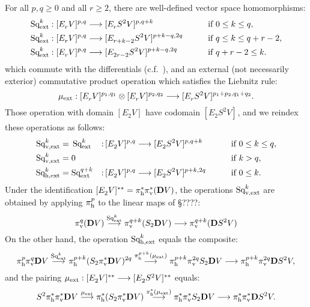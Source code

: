 \documentclass[11pt]{amsart}
\theoremstyle{plain}
\theoremstyle{definition}
\renewcommand{\to}{\longrightarrow}
\theoremstyle{plain}
\newcommand{\ExtCohOp}{\textup{Sq}_\textup{ext}}
\newcommand{\vExtCohOp}{\textup{Sq}_\textup{v,ext}}
\newcommand{\hExtCohOp}{\textup{Sq}_\textup{h,ext}}
\newcommand{\ExtCohProd}{\mu_\textup{ext}}
\newcommand{\E}[5]{[E^{#1}_{#2}#3]^{#4}_{#5}}
\newcommand{\dver}{_\textup{v}}
\newcommand{\dhor}{_\textup{h}}
\newcommand{\dual}{\mathbf{D}}
\begin{document}
\begin{Operations in composite functor spectral sequences}
For all $p,q\geq0$ and all $r\geq2$, there are well-defined vector space homomorphisms:
\begin{alignat*}{2}
\ExtCohOp^k:\E{}{r}{V}{p,q}{}&\to \E{}{r}{S^2V}{p,q+k}{}&\qquad&\text{if }0\leq k \leq q,\\
\ExtCohOp^k:\E{}{r}{V}{p,q}{}&\to \E{}{r+k-2}{S^2V}{p+k-q,2q}{}&\qquad&\text{if }q\leq k\leq q+r-2,\\
\ExtCohOp^k:\E{}{r}{V}{p,q}{}&\to \E{}{2r-2}{S^2V}{p+k-q,2q}{}&\qquad&\text{if }q+r-2\leq k.
\end{alignat*}
which commute with the differentials (c.f.\ \cite[Theorem 2.17]{MR2245560}), and an external (not necessarily exterior) commutative product operation which satisfies the Liebnitz rule:
\[\ExtCohProd:\E{}{r}{V}{p_1,q_1}{}\otimes \E{}{r}{V}{p_2,q_2}{}\to \E{}{r}{S^2V}{p_1+p_2,q_1+q_2}{}.\]
Those operation with domain $\E{}{2}{V}{}{}$ have codomain $\E{}{2}{S^2V}{}{}$, and we reindex these operations as follows: %
\begin{alignat*}{3}
\vExtCohOp^k&=\,\ExtCohOp^k&:\,&\E{}{2}{V}{p,q}{}\to \E{}{2}{S^2V}{p,q+k}{}&\qquad&\text{if }0\leq k \leq q,\\
\vExtCohOp^k&=0&&&&\text{if }k > q,\\
\hExtCohOp^k&=\ExtCohOp^{q+k}&:\,&\E{}{2}{V}{p,q}{}\to \E{}{2}{S^2V}{p+k,2q}{}&\qquad&\text{if }0\leq k.
\end{alignat*}
Under the identification $\E{}{2}{V}{**}{}=\pi\dhor^{*}\pi\dver^{*}(\dual V)$, the operations $\vExtCohOp^k$ %
are  obtained by applying $\pi\dhor^p$ to the linear maps of \S????:
\[\pi\dver^{q}(\dual V)\overset{\ExtCohOp^k}{\to} \pi\dver^{q+k}(S_2\dual V)\to \pi\dver^{q+k}(\dual S^2V)\]
On the other hand, the operation $\hExtCohOp^k$ equals the composite:
\[\pi\dhor^p\pi\dver^q\dual V
\overset{\ExtCohOp^k}{\to} 
\pi\dhor^{p+k}(S_2\pi\dver^*\dual V)^{2q}
\overset{\pi\dhor^{p+k}(\ExtCohProd)}{\to}
\pi\dhor^{p+k}\pi\dver^{2q}S_2\dual V
\to 
\pi\dhor^{p+k}\pi\dver^{2q}\dual S^2 V,
\]
 and the pairing $\ExtCohProd:\E{}{2}{V}{**}{}\to \E{}{2}{S^2V}{**}{}$ equals:
\[S^2\pi\dhor^*\pi\dver^*\dual V
\overset{\ExtCohProd}{\to} 
\pi\dhor^*(S_2\pi\dver^*\dual V)
\overset{\pi\dhor^{*}(\ExtCohProd)}{\to}
\pi\dhor^{*}\pi\dver^{*}S_2\dual V
\to 
\pi\dhor^{*}\pi\dver^{*}\dual S^2 V.
\]


\end{Operations in composite functor spectral sequences}
\end{document}
